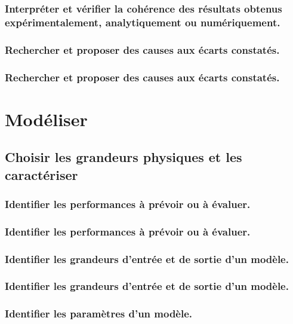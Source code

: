 \documentclass[10pt,fleqn]{book}
\begin{document}
\subsection{Interpréter et vérifier la cohérence des résultats obtenus expérimentalement, analytiquement ou numériquement. } 

\subsection{Rechercher et proposer des causes aux écarts constatés.} 

\subsection{Rechercher et proposer des causes aux écarts constatés.} 

\chapter{Modéliser} 

\section{Choisir les grandeurs physiques et les caractériser} 

\subsection{Identifier les performances à prévoir ou à évaluer.} 

\subsection{Identifier les performances à prévoir ou à évaluer.} 

\subsection{Identifier les grandeurs d'entrée et de sortie d’un modèle.} 

\subsection{Identifier les grandeurs d'entrée et de sortie d’un modèle.} 

\subsection{Identifier les paramètres d’un modèle.} 
\end{document}
